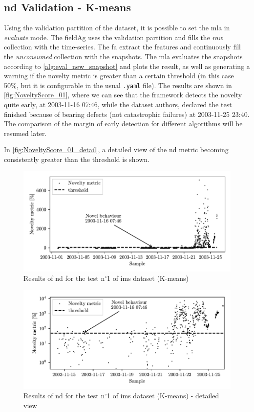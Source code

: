 \subsection{\gls{nd} Validation - K-means}
Using the validation partition of the dataset, it is possible to set the \gls{mla} in \emph{evaluate} mode. The \gls{fieldAg} uses the validation partition and fills the \emph{raw} collection with the time-series. The {\gls{fa}} extract the features and continuously fill the \emph{unconsumed} collection with the snapshots. The \gls{mla} evaluates the snapshots according to \autoref{alg:eval_new_snapshot}  and plots the result, as well as generating a warning if the novelty metric is greater than a certain threshold (in this case 50\%, but it is configurable in the usual \texttt{.yaml} file). The results are shown in \autoref{fig:NoveltyScore_01}, where we can see that the framework detects the novelty quite early, at 2003-11-16 07:46, while the dataset authors, declared the test finished because of bearing defects (not catastrophic failures) at 2003-11-25 23:40. The comparison of the margin of early detection for different algorithms will be resumed later.

In \autoref{fig:NoveltyScore_01_detail}, a detailed view of the \gls{nd} metric becoming consistently greater than the threshold is shown.

\begin{figure}
    \centering
    \includegraphics{images/IMS/Novelty_01_500samples_bearing3x.pdf}
    \caption{Results of \gls{nd} for the test $\text{n}^\circ$1 of \gls{ims} dataset (K-means)}
    \label{fig:NoveltyScore_01} 
\end{figure}

\begin{figure}
    \centering
    \includegraphics{images/IMS/Novelty_01_500samples_bearing3x_detail.pdf}
    \caption{Results of \gls{nd} for the test $\text{n}^\circ$1 of \gls{ims} dataset (K-means) - detailed view}
    \label{fig:NoveltyScore_01_detail} 
\end{figure}

